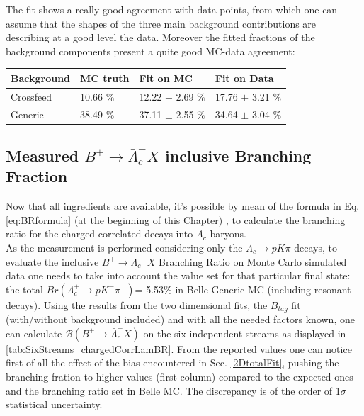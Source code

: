 \noindent The fit shows a really good agreement with data points, from which one can assume that the shapes of the three main background contributions are describing at a good level the data.  
Moreover the fitted fractions of the background components present a quite good MC-data agreement: \vspace{1. cm}
\\
\newline


\begin{tabular}{ |p{2.5cm}||p{3cm}|p{3.5cm}| p{3.5cm}| }
 \hline
Background & \hspace{0.2cm} MC truth & \hspace{0.5cm} Fit on MC   & \hspace{0.4cm} Fit on  Data\\
 \hline
 Crossfeed  &  10.66 $\%$ &  12.22 $\pm$  2.69 $\%$ &   17.76 $\pm$  3.21 $\%$\\
 Generic  &  38.49 $\%$ &   37.11 $\pm$  2.55 $\%$ &    34.64 $\pm$ 3.04 $\%$\\
 \hline
\end{tabular}

 \vspace{1.5 cm}
\subsection{Measured $B^+ \rightarrow \bar{\Lambda}_c^- X$ inclusive Branching Fraction}\label{BrValue}

Now that all ingredients are available, it's possible by mean of the formula in Eq. \ref{eq:BRformula} (at the beginning of this Chapter) , to calculate the branching ratio for the charged correlated decays into $\Lambda_c$ baryons. \\
As the measurement is performed considering only the $\Lambda_c \rightarrow p K \pi$ decays, to evaluate the inclusive $B^+ \rightarrow \bar{\Lambda_c}^- X$ Branching Ratio on Monte Carlo simulated data one needs to take into account the value set for that particular final state: the total $Br(\Lambda_c^+ \rightarrow p K^- \pi^+) $= 5.53$\%$ in Belle Generic MC (including resonant decays).  
Using the results from the two dimensional fits, the $B_{tag}$ fit (with/without background included) and with all the needed factors known, one can calculate  $\mathcal{B}(B^+ \rightarrow \bar{\Lambda}_c^- X)$ on the six independent streams as displayed in \cref{tab:SixStreams_chargedCorrLamBR}. From the reported values one can notice first of all the effect of the bias encountered in Sec. \ref{2DtotalFit}, pushing the branching fration to higher values (first column) compared to the expected ones and the branching ratio set in Belle MC. The discrepancy is of the order of 1$\sigma$ statistical uncertainty. %


